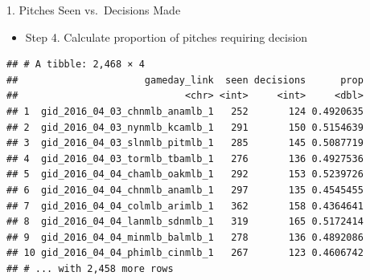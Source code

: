 \begin{frame}[fragile]{1. Pitches Seen vs.~Decisions Made}

\begin{itemize}
\tightlist
\item
  Step 4. Calculate proportion of pitches requiring decision
\end{itemize}

\footnotesize

\begin{Shaded}
\end{Shaded}

\begin{verbatim}
## # A tibble: 2,468 × 4
##                      gameday_link  seen decisions      prop
##                             <chr> <int>     <int>     <dbl>
## 1  gid_2016_04_03_chnmlb_anamlb_1   252       124 0.4920635
## 2  gid_2016_04_03_nynmlb_kcamlb_1   291       150 0.5154639
## 3  gid_2016_04_03_slnmlb_pitmlb_1   285       145 0.5087719
## 4  gid_2016_04_03_tormlb_tbamlb_1   276       136 0.4927536
## 5  gid_2016_04_04_chamlb_oakmlb_1   292       153 0.5239726
## 6  gid_2016_04_04_chnmlb_anamlb_1   297       135 0.4545455
## 7  gid_2016_04_04_colmlb_arimlb_1   362       158 0.4364641
## 8  gid_2016_04_04_lanmlb_sdnmlb_1   319       165 0.5172414
## 9  gid_2016_04_04_minmlb_balmlb_1   278       136 0.4892086
## 10 gid_2016_04_04_phimlb_cinmlb_1   267       123 0.4606742
## # ... with 2,458 more rows
\end{verbatim}

\end{frame}

